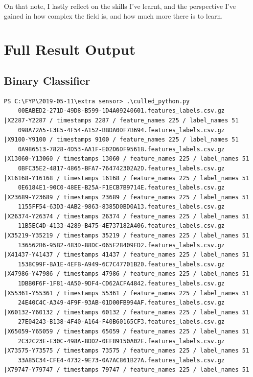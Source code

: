 \documentclass{UoNMCHA}
\numberwithin{equation}{section}
\begin{document}
On that note, I lastly reflect on the skills I've learnt, and the perspective I've gained in how complex the field is, and how much more there is to learn.


\clearpage \section{Full Result Output}

\subsection{Binary Classifier}
\begin{lstlisting}[breaklines=true]
    PS C:\FYP\2019-05-11\extra sensor> .\culled_python.py
    00EABED2-271D-49D8-B599-1D4A09240601.features_labels.csv.gz |X2287-Y2287 / timestamps 2287 / feature_names 225 / label_names 51
    098A72A5-E3E5-4F54-A152-BBDA0DF7B694.features_labels.csv.gz |X9100-Y9100 / timestamps 9100 / feature_names 225 / label_names 51
    0A986513-7828-4D53-AA1F-E02D6DF9561B.features_labels.csv.gz |X13060-Y13060 / timestamps 13060 / feature_names 225 / label_names 51
    0BFC35E2-4817-4865-BFA7-764742302A2D.features_labels.csv.gz |X16168-Y16168 / timestamps 16168 / feature_names 225 / label_names 51
    0E6184E1-90C0-48EE-B25A-F1ECB7B9714E.features_labels.csv.gz |X23689-Y23689 / timestamps 23689 / feature_names 225 / label_names 51
    1155FF54-63D3-4AB2-9863-8385D0BD0A13.features_labels.csv.gz |X26374-Y26374 / timestamps 26374 / feature_names 225 / label_names 51
    11B5EC4D-4133-4289-B475-4E737182A406.features_labels.csv.gz |X35219-Y35219 / timestamps 35219 / feature_names 225 / label_names 51
    136562B6-95B2-483D-88DC-065F28409FD2.features_labels.csv.gz |X41437-Y41437 / timestamps 41437 / feature_names 225 / label_names 51
    1538C99F-BA1E-4EFB-A949-6C7C47701B20.features_labels.csv.gz |X47986-Y47986 / timestamps 47986 / feature_names 225 / label_names 51
    1DBB0F6F-1F81-4A50-9DF4-CD62ACFA4842.features_labels.csv.gz |X55361-Y55361 / timestamps 55361 / feature_names 225 / label_names 51
    24E40C4C-A349-4F9F-93AB-01D00FB994AF.features_labels.csv.gz |X60132-Y60132 / timestamps 60132 / feature_names 225 / label_names 51
    27E04243-B138-4F40-A164-F40B60165CF3.features_labels.csv.gz |X65059-Y65059 / timestamps 65059 / feature_names 225 / label_names 51
    2C32C23E-E30C-498A-8DD2-0EFB9150A02E.features_labels.csv.gz |X73575-Y73575 / timestamps 73575 / feature_names 225 / label_names 51
    33A85C34-CFE4-4732-9E73-0A7AC861B27A.features_labels.csv.gz |X79747-Y79747 / timestamps 79747 / feature_names 225 / label_names 51

\end{lstlisting}
\end{document}
